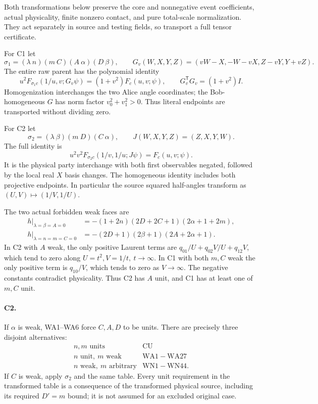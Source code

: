 Both transformations below preserve the core and nonnegative event
coefficients, actual physicality, finite nonzero contact, and pure
total-scale normalization. They act separately in source and testing
fields, so transport a full tensor certificate.

For C1 let
\[
 \sigma_1=(\lambda\ n)(m\ C)(A\ \alpha)(D\ \beta),\qquad
 G_v(W,X,Y,Z)=(vW-X,-W-vX,Z-vY,Y+vZ).
\]
The entire raw parent has the polynomial identity
\[
 u^2F_{\sigma_1c}(1/u,v;G_v\psi)
       =(1+v^2)F_c(u,v;\psi),\qquad
 G_v^{\mathsf T}G_v=(1+v^2)I .
 \tag{AU12}
\]
Homogenization interchanges the two Alice angle coordinates;
the Bob-homogeneous \(G\) has norm factor \(v_0^2+v_1^2>0\).
Thus literal endpoints are transported without dividing zero.

For C2 let
\[
 \sigma_2=(\lambda\ \beta)(m\ D)(C\ \alpha),\qquad
 J(W,X,Y,Z)=(Z,X,Y,W).
\]
The full identity is
\[
 u^2v^2F_{\sigma_2c}(1/v,1/u;J\psi)=F_c(u,v;\psi).
 \tag{AU13}
\]
It is the physical party interchange with both first observables
negated, followed by the local real \(X\) basis changes.
The homogeneous identity includes both projective endpoints.
In particular the source squared half-angles transform as
\((U,V)\mapsto(1/V,1/U)\).

The two actual forbidden weak faces are
\[
\begin{aligned}
 h|_{\lambda=\beta=A=0}
 &=-(1+2n)(2D+2C+1)(2\alpha+1+2m),\\
 h|_{\lambda=n=m=C=0}
 &=-(2D+1)(2\beta+1)(2A+2\alpha+1).
\end{aligned}\tag{AU14}
\]
In C2 with \(A\) weak, the only positive Laurent terms are
\(q_{01}/U+q_{02}V/U+q_{12}V\), which tend to zero along
\(U=t^2,V=1/t,\ t\to\infty\).
In C1 with both \(m,C\) weak the only positive term is \(q_{10}/V\),
which tends to zero as \(V\to\infty\).
The negative constants contradict physicality.
Thus C2 has \(A\) unit, and C1 has at least one of \(m,C\) unit.


\paragraph{C2.}
If \(\alpha\) is weak, WA1--WA6 force \(C,A,D\) to be units.
There are precisely three disjoint alternatives:
\[
\begin{array}{c|c}
 n,m\text{ units}&\mathrm{CU}\\
 n\text{ unit},\ m\text{ weak}&\mathrm{WA1\!-\!WA27}\\
 n\text{ weak},\ m\text{ arbitrary}&\mathrm{WN1\!-\!WN44}.
\end{array}\tag{AU15}
\]
If \(C\) is weak, apply \(\sigma_2\) and the same table.
Every unit requirement in the transformed table is a consequence
of the transformed physical source, including its required
\(D'=m\) bound; it is not assumed for an excluded original case.

